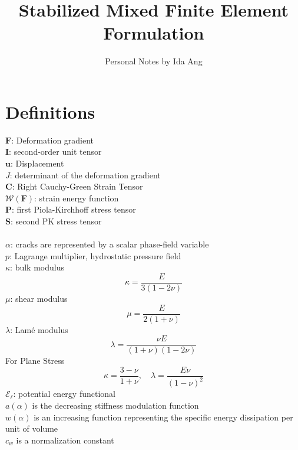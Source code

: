 \documentclass[12pt,3p]{article}
\numberwithin{equation}{section}
\begin{document}
\title{Stabilized Mixed Finite Element Formulation}
\author{Personal Notes by Ida Ang}
\maketitle

\section*{Definitions}
$\mathbf{F}$: Deformation gradient \\
$\mathbf{I}$: second-order unit tensor \\
$\bm{u}$: Displacement \\
$J$: determinant of the deformation gradient \\
$\mathbf{C}$: Right Cauchy-Green Strain Tensor \\
$\mathcal{W}(\mathbf{F})$: strain energy function \\
$\mathbf{P}$: first Piola-Kirchhoff stress tensor \\
$\mathbf{S}$: second PK stress tensor \\ \\
$\alpha$: cracks are represented by a scalar phase-field variable \\
$p$: Lagrange multiplier, hydrostatic pressure field \\
$\kappa$: bulk modulus 
\begin{equation}
\kappa = \frac{E}{3 (1 - 2 \nu)}
\end{equation}
$\mu$: shear modulus 
\begin{equation}
\mu = \frac{E}{2 (1 + \nu)}
\end{equation}
$\lambda$: Lamé modulus 
\begin{equation}
\lambda = \frac{\nu E}{(1+ \nu) (1 - 2 \nu)}
\end{equation}
For Plane Stress
\begin{equation}
\kappa = \frac{3- \nu}{1 +\nu}, \quad \lambda = \frac{E \nu}{(1 - \nu)^2}
\end{equation}
$\mathcal{E}_\ell$: potential energy functional \\
$a(\alpha)$ is the decreasing stiffness modulation function \\ 
$w(\alpha)$ is an increasing function representing the specific energy dissipation per unit of volume \\
$c_w$ is a normalization constant 
\end{document}
